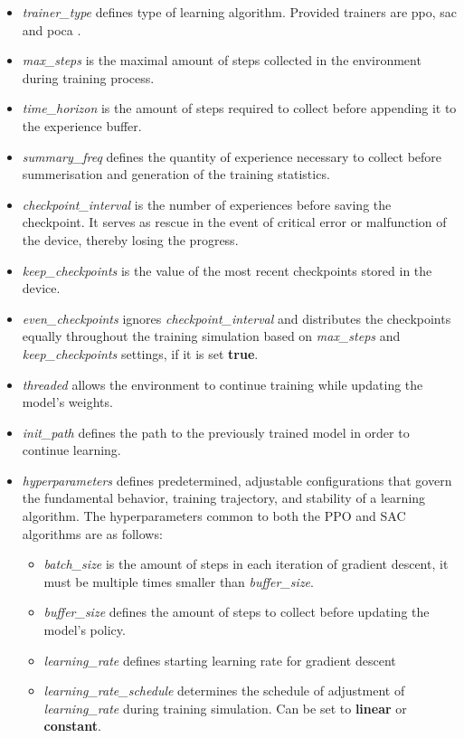 \begin{itemize}
	\item \textit{trainer\_type} defines type of learning algorithm. Provided trainers are ppo, sac and poca \cite{cohen2022}.
	\item \textit{max\_steps} is the maximal amount of steps collected in the environment during training process. 
	\item \textit{time\_horizon} is the amount of steps required to collect before appending it to the experience buffer.
	\item \textit{summary\_freq} defines the quantity of experience necessary to collect before summerisation and generation of the training statistics.
	\item \textit{checkpoint\_interval} is the number of experiences before saving the checkpoint. It serves as rescue in the event of critical error or malfunction of the device, thereby losing the progress.
	\item \textit{keep\_checkpoints} is the value of the most recent checkpoints stored in the device.
	\item \textit{even\_checkpoints} ignores \textit{checkpoint\_interval} and distributes the checkpoints equally  throughout the training simulation based on \textit{max\_steps} and \textit{keep\_checkpoints} settings, if it is set \textbf{true}.
	\item \textit{threaded} allows the environment to continue training while updating the model's weights.
	\item \textit{init\_path} defines the path to the previously trained model in order to continue learning.
	\item \textit{hyperparameters} defines predetermined, adjustable configurations that govern the fundamental behavior, training trajectory, and stability of a learning algorithm. The hyperparameters common to both the PPO and SAC algorithms are as follows:
	\begin{itemize}
		\item \textit{batch\_size} is the amount of steps in each iteration of gradient descent, it must be multiple times smaller than \textit{buffer\_size}.
		\item \textit{buffer\_size} defines the amount of steps to collect before updating the model's policy. 
		\item \textit{learning\_rate} defines starting learning rate for gradient descent
		\item \textit{learning\_rate\_schedule} determines the schedule of adjustment of \textit{learning\_rate} during training simulation. Can be set to \textbf{linear} or \textbf{constant}.
	\end{itemize}
\end{itemize}

